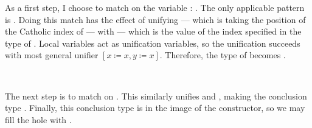 As a first step, I choose to match on the variable
\AgdaSpace{}\AgdaSymbol:\AgdaSpace{}%
\AgdaSpace{}%
\AgdaSpace{}%
.
The only applicable pattern is .
Doing this match has the effect of unifying  --- which is taking
the position of the Catholic index of \AgdaDatatype{\_$\equiv$\_} --- with
 --- which is the value of the index specified in the type of
.
Local variables act as unification variables, so the unification succeeds with
most general unifier $[x \coloneqq x, y \coloneqq x]$.
Therefore, the type of  becomes
\AgdaSpace{}%
\AgdaSpace{}%
.

\begin{code}
\>[0]\AgdaSpace{}%
\AgdaSymbol{:}\AgdaSpace{}%
\AgdaSpace{}%
\AgdaSymbol{\{}\AgdaSpace{}%
\AgdaSymbol{:}\AgdaSpace{}%
\AgdaSymbol{\}}\AgdaSpace{}%
\AgdaSymbol{\{}\AgdaSpace{}%
\AgdaSpace{}%
\AgdaSpace{}%
\AgdaSymbol{:}\AgdaSpace{}%
\AgdaSymbol{\}}\AgdaSpace{}%
\AgdaSpace{}%
\AgdaSpace{}%
\AgdaSpace{}%
\AgdaSpace{}%
\AgdaSpace{}%
\AgdaSpace{}%
\AgdaSpace{}%
\AgdaSpace{}%
\AgdaSpace{}%
\AgdaSpace{}%
\AgdaSpace{}%
\<%
\\
\>[0]\AgdaSpace{}%
\AgdaSpace{}%
\AgdaSpace{}%
\AgdaSymbol{=}\AgdaSpace{}%
\<%
\end{code}

The next step is to match on .
This similarly unifies  and , making the conclusion
type
\AgdaSpace{}%
\AgdaSpace{}%
.
Finally, this conclusion type is in the image of the
 constructor, so we may fill the hole with
.


